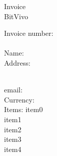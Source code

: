 \documentclass[12pt]{article}
\begin{document}
\begin{center} 
	
	\Large Invoice\\[0.25cm]

	\normalsize BitVivo
\end{center}

\noindent Invoice number: \invoicenr\\ \invoicedate\\
Name: \firstname\ \lastname \\
Address: \address\ \country\\
email: \email\\
Currency: \currency\\
Items: \csname item0\endcsname\\ \csname item1\endcsname\\ \csname item2\endcsname\\ \csname item3\endcsname\\ \csname item4\endcsname
\end{document}
